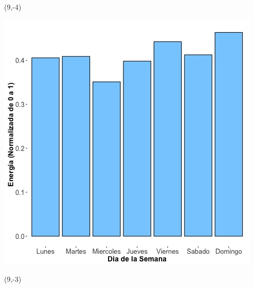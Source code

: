 \documentclass{article}\usepackage[]{graphicx}\usepackage[]{color}
\newenvironment{knitrout}{}{} %
\begin{document}
 \begin{textblock}{1}(9,-4)
\begin{minipage}{20em}
\begingroup

\endgroup
\end{minipage}
\end{textblock}


\begin{knitrout}
\color{fgcolor}
\includegraphics[scale=0.65]{figure/A19_day_of_week_plot} 
\end{knitrout}


 \begin{textblock}{1}(9,-3)
\begin{minipage}{20em}
\begingroup

\endgroup
\end{minipage}
\end{textblock}
\end{document}
